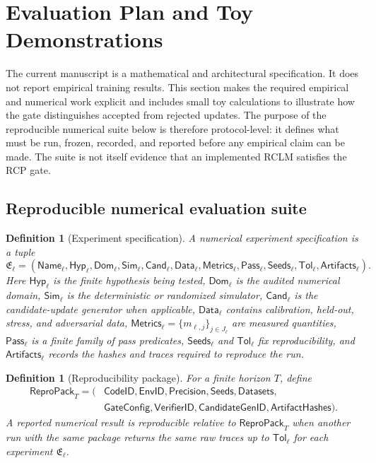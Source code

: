 \documentclass[11pt,a4paper]{article}
\newtheorem{definition}[theorem]{Definition}
\begin{document}
\section{Evaluation Plan and Toy Demonstrations}

The current manuscript is a mathematical and architectural specification.  It does not report empirical training results.  This section makes the required empirical and numerical work explicit and includes small toy calculations to illustrate how the gate distinguishes accepted from rejected updates.  The purpose of the reproducible numerical suite below is therefore protocol-level: it defines what must be run, frozen, recorded, and reported before any empirical claim can be made.  The suite is not itself evidence that an implemented RCLM satisfies the RCP gate.

\subsection{Reproducible numerical evaluation suite}

\begin{definition}[Experiment specification]
A numerical experiment specification is a tuple
\[
\mathfrak E_\ell=
(\mathsf{Name}_\ell,\mathsf{Hyp}_\ell,\mathsf{Dom}_\ell,\mathsf{Sim}_\ell,
\mathsf{Cand}_\ell,\mathsf{Data}_\ell,\mathsf{Metrics}_\ell,
\mathsf{Pass}_\ell,\mathsf{Seeds}_\ell,\mathsf{Tol}_\ell,\mathsf{Artifacts}_\ell).
\]
Here \(\mathsf{Hyp}_\ell\) is the finite hypothesis being tested, \(\mathsf{Dom}_\ell\) is the audited numerical domain, \(\mathsf{Sim}_\ell\) is the deterministic or randomized simulator, \(\mathsf{Cand}_\ell\) is the candidate-update generator when applicable, \(\mathsf{Data}_\ell\) contains calibration, held-out, stress, and adversarial data, \(\mathsf{Metrics}_\ell=\{m_{\ell,j}\}_{j\in J_\ell}\) are measured quantities, \(\mathsf{Pass}_\ell\) is a finite family of pass predicates, \(\mathsf{Seeds}_\ell\) and \(\mathsf{Tol}_\ell\) fix reproducibility, and \(\mathsf{Artifacts}_\ell\) records the hashes and traces required to reproduce the run.
\end{definition}

\begin{definition}[Reproducibility package]
For a finite horizon \(T\), define
\[
\begin{aligned}
\mathsf{ReproPack}_T=(
&\mathsf{CodeID},\mathsf{EnvID},\mathsf{Precision},\mathsf{Seeds},\mathsf{Datasets},\\
&\mathsf{GateConfig},\mathsf{VerifierID},\mathsf{CandidateGenID},\mathsf{ArtifactHashes}).
\end{aligned}
\]
A reported numerical result is \emph{reproducible relative to} \(\mathsf{ReproPack}_T\) when another run with the same package returns the same raw traces up to \(\mathsf{Tol}_\ell\) for each experiment \(\mathfrak E_\ell\).
\end{definition}
\end{document}
